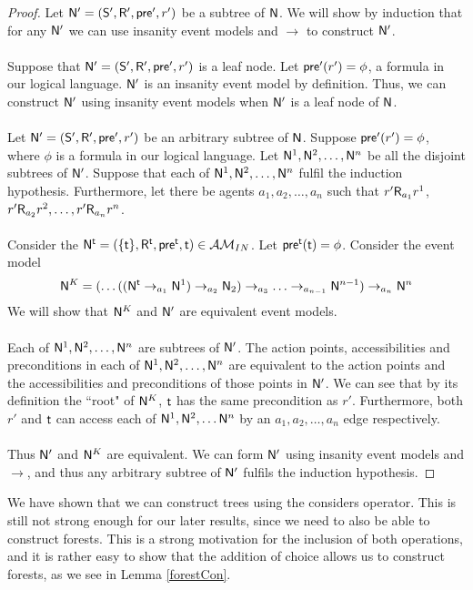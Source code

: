 \begin{proof}
Let $\mathrm{\mathsf{N}}' = (\mathrm{\mathsf{S}}', \mathrm{\mathsf{R}}', \mathrm{\mathsf{pre}}', r')$ be a subtree of $\mathrm{\mathsf{N}}$.
We will show by induction that for any $\mathrm{\mathsf{N}}'$ we can use insanity event models and $\to$ to
construct $\mathrm{\mathsf{N}}'$.\\
\\
Suppose that $\mathrm{\mathsf{N}}' = (\mathrm{\mathsf{S}}', \mathrm{\mathsf{R}}', \mathrm{\mathsf{pre}}', r')$ is a leaf node.
Let $\mathrm{\mathsf{pre}}'(r') = \phi$, a formula in our logical language.
$\mathrm{\mathsf{N}}'$ is an insanity event model by definition.
Thus, we can construct $\mathrm{\mathsf{N}}'$ using insanity event models when $\mathrm{\mathsf{N}}'$ is a leaf node of $\mathrm{\mathsf{N}}$.\\
\\
Let $\mathrm{\mathsf{N}}' = (\mathrm{\mathsf{S}}', \mathrm{\mathsf{R}}', \mathrm{\mathsf{pre}}', r')$ be an arbitrary subtree of $\mathrm{\mathsf{N}}$.
Suppose $\mathrm{\mathsf{pre}}'(r') = \phi$, where $\phi$ is a formula in our logical language.
Let $\mathrm{\mathsf{N}}^1, \mathrm{\mathsf{N}}^2, \ldots, \mathrm{\mathsf{N}}^n$ be all the disjoint subtrees of $\mathrm{\mathsf{N}}'$.
Suppose that each of $\mathrm{\mathsf{N}}^1, \mathrm{\mathsf{N}}^2, \ldots, \mathrm{\mathsf{N}}^n$ fulfil the induction hypothesis.
Furthermore, let there be agents $a_1, a_2, \ldots, a_n$ such that $r' \mathrm{\mathsf{R}}_{a_1} r^1$, $r' \mathrm{\mathsf{R}}_{a_2} r^2,
	\ldots, r' \mathrm{\mathsf{R}}_{a_n} r^n$.\\
\\
Consider the $\mathrm{\mathsf{N}}^\mathrm{\mathsf{t}} = (\{ \mathrm{\mathsf{t}} \}, \mathrm{\mathsf{R}}^\mathrm{\mathsf{t}}, \mathrm{\mathsf{pre}}^\mathrm{\mathsf{t}}, \mathrm{\mathsf{t}}) \in \mathcal{AM}_{IN}$.
Let $\mathrm{\mathsf{pre}}^\mathrm{\mathsf{t}}(\mathrm{\mathsf{t}}) = \phi$.
Consider the event model 
\[
\mathrm{\mathsf{N}}^K = (\ldots((\mathrm{\mathsf{N}}^\mathrm{\mathsf{t}} \to_{a_1} \mathrm{\mathsf{N}} ^ 1) \to_{a_2} \mathrm{\mathsf{N}}_2) \to_{a_3} \ldots
\to_{a_{n-1}} \mathrm{\mathsf{N}}^{n-1} ) \to_{a_n} \mathrm{\mathsf{N}} ^ n
\]
We will show that $\mathrm{\mathsf{N}}^K$ and $\mathrm{\mathsf{N}}'$ are equivalent event models.\\
\\
Each of $\mathrm{\mathsf{N}}^1, \mathrm{\mathsf{N}}^2, \ldots, \mathrm{\mathsf{N}}^n$ are subtrees of $\mathrm{\mathsf{N}}'$.
The action points, accessibilities and preconditions in each of $\mathrm{\mathsf{N}}^1, \mathrm{\mathsf{N}}^2, \ldots, \mathrm{\mathsf{N}}^n$ are
equivalent to the action points and the accessibilities and preconditions of those points in $\mathrm{\mathsf{N}}'$.
We can see that by its definition the ``root" of $\mathrm{\mathsf{N}}^K$, $\mathrm{\mathsf{t}}$ has the same precondition as $r'$.
Furthermore, both $r'$ and $\mathrm{\mathsf{t}}$ can access each of $\mathrm{\mathsf{N}}^1, \mathrm{\mathsf{N}}^2, \ldots \mathrm{\mathsf{N}}^n$ by an $a_1, a_2, \ldots, a_n$ edge
respectively.\\
\\
Thus $\mathrm{\mathsf{N}}'$ and $\mathrm{\mathsf{N}}^K$ are equivalent.
We can form $\mathrm{\mathsf{N}}'$ using insanity event models and $\to$, and thus any arbitrary subtree of $\mathrm{\mathsf{N}}'$
fulfils the induction hypothesis.
\end{proof}

We have shown that we can construct trees using the considers operator.
This is still not strong enough for our later results, since we need to also be able to construct
forests.
This is a strong motivation for the inclusion of both operations, and it is rather easy to show that
the addition of choice allows us to construct forests, as we see in Lemma \ref{forestCon}.

